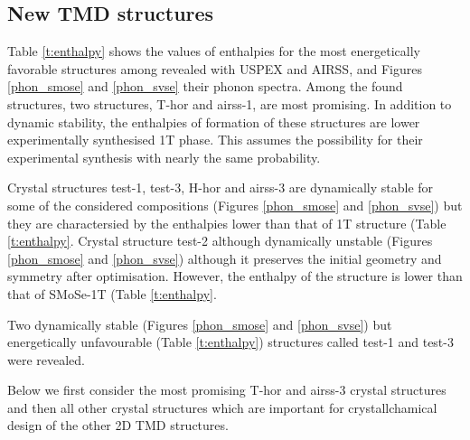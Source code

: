 \documentclass[a4paperm]{article}
\begin{document}
		\subsection{New TMD structures}

Table \ref{t:enthalpy} shows the values of enthalpies for the most energetically favorable structures among revealed with USPEX and AIRSS, and Figures \ref{phon_smose} and  \ref{phon_svse} their phonon spectra. 
Among the found structures, two structures, T-hor and airss-1, are most promising.
In addition to dynamic stability, the enthalpies of formation of these structures are lower experimentally synthesised 1T phase.
This assumes the possibility for their experimental synthesis with nearly the same probability.

Crystal structures test-1, test-3, H-hor and airss-3 are dynamically stable for some of the considered compositions (Figures \ref{phon_smose} and  \ref{phon_svse}) but they are charactersied by the enthalpies lower than that of 1T structure (Table \ref{t:enthalpy}. 
Crystal structure test-2 although dynamically unstable (Figures \ref{phon_smose} and  \ref{phon_svse}) although it preserves the initial geometry and symmetry after optimisation.
However, the enthalpy of the structure is lower than that of SMoSe-1T  (Table \ref{t:enthalpy}.

Two dynamically stable (Figures \ref{phon_smose} and  \ref{phon_svse}) but energetically unfavourable (Table \ref{t:enthalpy}) structures called test-1 and test-3 were revealed.

Below we first consider the most promising T-hor and airss-3 crystal structures and then all other crystal structures which are important for crystallchamical design of the other 2D TMD structures.


\end{document}
